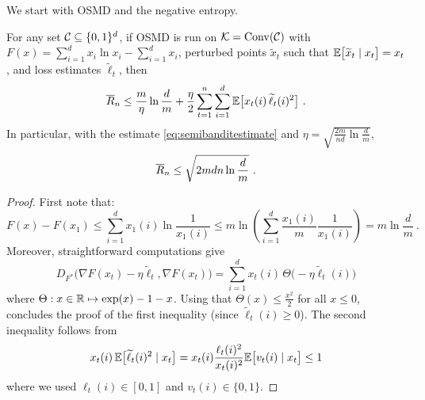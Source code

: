 %

We start with OSMD and the negative entropy.
%
\begin{theorem}
\label{th:osmdnegent}
For any set $\mathcal{C}\subseteq\{0,1\}^d$, if OSMD is run on $\mathcal{K}=\mathrm{Conv}(\mathcal{C})$ with $F(x) = \sum_{i=1}^d x_i \ln x_i - \sum_{i=1}^d x_i$, perturbed points $\tilde{x}_t$ such that $\mathbb{E}\bigl[\widetilde{x}_t \mid x_t\bigr] = x_t$, and loss estimates $\tilde{\ell}_t$, then
$$\overline{R}_n \leq \frac{m}{\eta}\ln \frac{d}{m} + \frac{\eta}{2} \sum_{t=1}^n \sum_{i=1}^d \mathbb{E}\bigl[x_t(i)\,\widetilde{\ell}_t(i)^2\bigr]~.$$
In particular, with the estimate \eqref{eq:semibanditestimate} and $\eta= \sqrt{\frac{2m}{nd}\ln\frac{d}{m}}$,
$$\overline{R}_n \leq  \sqrt{2 m d n \ln \frac{d}{m}}~.$$
\end{theorem}
%
\begin{proof}
First note that:
$$F(x) - F(x_1) \leq \sum_{i=1}^d x_1(i) \ln \frac{1}{x_1(i)} \leq m \ln \left( \sum_{i=1}^d \frac{x_1(i)}{m} \frac{1}{x_1(i)}\right) = m \ln \frac{d}{m}~.$$
Moreover, straightforward computations give
$$D_{F^*}\bigg(\nabla F(x_t) - \eta \tilde{\ell}_t, \nabla F(x_t)\bigg) =\sum_{i=1}^d x_{t}(i)\, \Theta\bigl(- \eta \tilde{\ell}_t(i)\bigr)$$
where $\Theta : x \in \mathbb{R} \mapsto \exp(x) - 1 - x$. Using that $\Theta(x) \leq \frac{x^2}{2}$ for all $x \leq 0$, concludes the proof of the first inequality (since $\tilde{\ell}_t(i) \geq 0$). The second inequality follows from
\[
    x_t(i)\,\mathbb{E}\bigl[\widetilde{\ell}_t(i)^2 \mid x_t\bigr] = x_t(i)\frac{\ell_t(i)^2}{x_t(i)^2}\mathbb{E}\bigl[v_t(i) \mid x_t\bigr] \le 1
\]
where we used $\ell_t(i) \in [0,1]$ and $v_t(i) \in \{0,1\}$.
\end{proof}
